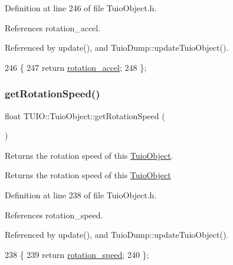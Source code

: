 Definition at line 246 of file Tuio\+Object.\+h.



References rotation\+\_\+accel.



Referenced by update(), and Tuio\+Dump\+::update\+Tuio\+Object().


\begin{DoxyCode}
246                                  \{
247             \textcolor{keywordflow}{return} \hyperlink{class_t_u_i_o_1_1_tuio_object_a793a29a0bf9fd2f1becdb9d2d45fc463}{rotation\_accel};
248         \};
\end{DoxyCode}
\mbox{\label{class_t_u_i_o_1_1_tuio_object_af2257dc8331077f50a618cc61474bf81}} 
\subsubsection{\texorpdfstring{get\+Rotation\+Speed()}{getRotationSpeed()}}
{\footnotesize\ttfamily float T\+U\+I\+O\+::\+Tuio\+Object\+::get\+Rotation\+Speed (\begin{DoxyParamCaption}{ }\end{DoxyParamCaption})\hspace{0.3cm}{\ttfamily [inline]}}

Returns the rotation speed of this \hyperlink{class_t_u_i_o_1_1_tuio_object}{Tuio\+Object}. \begin{DoxyReturn}{Returns}
the rotation speed of this \hyperlink{class_t_u_i_o_1_1_tuio_object}{Tuio\+Object} 
\end{DoxyReturn}


Definition at line 238 of file Tuio\+Object.\+h.



References rotation\+\_\+speed.



Referenced by update(), and Tuio\+Dump\+::update\+Tuio\+Object().


\begin{DoxyCode}
238                                  \{ 
239             \textcolor{keywordflow}{return} \hyperlink{class_t_u_i_o_1_1_tuio_object_aee8d80d314a66646b834b2d74e0073d1}{rotation\_speed};
240         \};
\end{DoxyCode}
\mbox{\label{class_t_u_i_o_1_1_tuio_object_a0d0b9b6e48c657350559acded6a1e53b}} 

